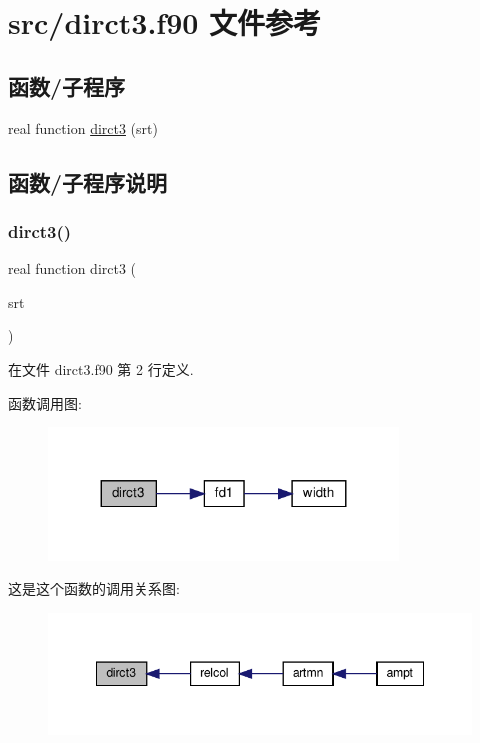 \hypertarget{dirct3_8f90}{}\section{src/dirct3.f90 文件参考}
\label{dirct3_8f90}
\subsection*{函数/子程序}
\begin{DoxyCompactItemize}
\item 
real function \mbox{\hyperlink{dirct3_8f90_aeb73336877adef76437ff14a4fc51de7}{dirct3}} (srt)
\end{DoxyCompactItemize}


\subsection{函数/子程序说明}
\mbox{\label{dirct3_8f90_aeb73336877adef76437ff14a4fc51de7}} 
\subsubsection{\texorpdfstring{dirct3()}{dirct3()}}
{\footnotesize\ttfamily real function dirct3 (\begin{DoxyParamCaption}\item[{}]{srt }\end{DoxyParamCaption})}



在文件 dirct3.\+f90 第 2 行定义.

函数调用图\+:
\nopagebreak
\begin{figure}[H]
\begin{center}
\leavevmode
\includegraphics[width=263pt]{dirct3_8f90_aeb73336877adef76437ff14a4fc51de7_cgraph}
\end{center}
\end{figure}
这是这个函数的调用关系图\+:
\nopagebreak
\begin{figure}[H]
\begin{center}
\leavevmode
\includegraphics[width=348pt]{dirct3_8f90_aeb73336877adef76437ff14a4fc51de7_icgraph}
\end{center}
\end{figure}
